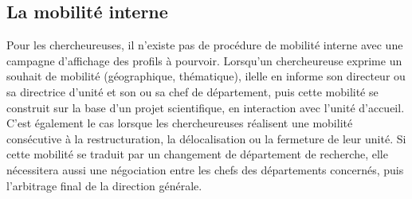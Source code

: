 \subsection{La mobilit\'e interne}

Pour les chercheur\mp euse\mp s, il n'existe pas de proc\'edure de mobilit\'e interne avec une campagne d'affichage des profils \`a pourvoir. Lorsqu'un chercheur\mp euse exprime un souhait de mobilit\'e (g\'eographique, th\'ematique), il\mp elle en informe son directeur ou sa directrice d'unit\'e et son ou sa chef de d\'epartement, puis cette mobilit\'e se construit sur la base d'un projet scientifique, en interaction avec l'unit\'e d'accueil. C'est \'egalement le cas lorsque les chercheur\mp euse\mp s r\'ealisent une mobilit\'e cons\'ecutive \`a la restructuration, la d\'elocalisation ou la fermeture de leur unit\'e. Si cette mobilit\'e se traduit par un changement de d\'epartement de recherche, elle n\'ecessitera aussi une n\'egociation entre les chefs des d\'epartements concern\'es, puis l'arbitrage final de la direction g\'en\'erale.
